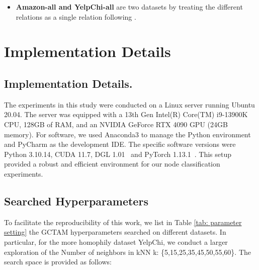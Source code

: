 \begin{appendix}
\begin{itemize}
    \item \textbf{Amazon-all and YelpChi-all}  are two datasets by treating the different relations as a single relation following \cite{chen2022gccad}.
\end{itemize}






\section{Implementation Details}
\subsection{Implementation Details.} 
The experiments in this study were conducted on a Linux server running Ubuntu 20.04. The server was equipped with a 13th Gen Intel(R) Core(TM) i9-13900K CPU, 128GB of RAM, and an NVIDIA GeForce RTX 4090 GPU (24GB memory). For software, we used Anaconda3 to manage the Python environment and PyCharm as the development IDE. The specific software versions were Python 3.10.14, CUDA 11.7, DGL 1.01~\cite{wang2019deep} and PyTorch 1.13.1~\cite{44_paszke2019pytorch}. This setup provided a robust and efficient environment for our node classification experiments.



\subsection{Searched Hyperparameters}
\label{app: search hyper}

To facilitate the reproducibility of this work, we list in Table \ref{tab: parameter setting} the GCTAM hyperparameters searched on different datasets. In particular, for the more homophily dataset YelpChi, we conduct a larger exploration of the Number of neighbors in kNN k: \{5,15,25,35,45,50,55,60\}.
The search space is provided as follows:


\begin{table}[ht!]
\centering
\caption{Hyperparameter settings on each dataset.}
\label{tab: parameter setting}
\end{table}



\end{appendix}
